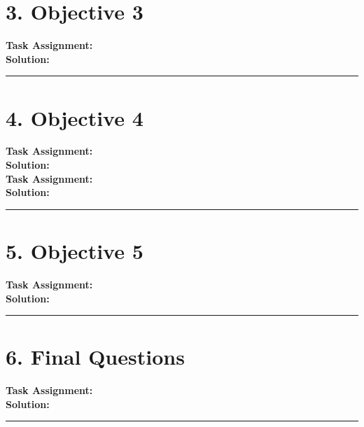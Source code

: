 \documentclass[a4paper,12pt]{article}
\begin{document}
\section*{3. Objective 3}

\textbf{Task Assignment:} \\

\textbf{Solution:} \\

\vspace{1em}
\hrule
\vspace{0.5em}

\section*{4. Objective 4}

\textbf{Task Assignment:} \\

\textbf{Solution:} \\[1em]

\textbf{Task Assignment:} \\

\textbf{Solution:} \\

\vspace{1em}
\hrule
\vspace{0.5em}

\section*{5. Objective 5}

\textbf{Task Assignment:} \\

\textbf{Solution:} \\

\vspace{1em}
\hrule
\vspace{0.5em}

\section*{6. Final Questions}

\textbf{Task Assignment:} \\

\textbf{Solution:} \\

\vspace{1em}
\hrule
\vspace{0.5em}
\end{document}
